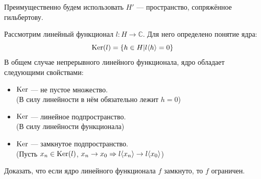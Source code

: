 \documentclass[12pt]{article}
\begin{document}
		Преимущественно будем использовать $H'$ --- пространство, сопряжённое гильбертову.
	
		Рассмотрим линейный функционал $l: H \rightarrow \mathbb{C}$. Для него определено понятие ядра:
		$$\text{Ker}(l) = \{ h \in H | l \langle h \rangle = 0\}$$
		В общем случае непрерывного линейного функционала, ядро обладает следующими свойствами:
		\begin{itemize}
			\item $\text{Ker}$ --- не пустое множество. \\
			(В силу линейности в нём обязательно лежит $h = 0$)
			\item $\text{Ker}$ --- линейное подпространство. \\
			(В силу линейности функционала)
			\item $\text{Ker}$ --- замкнутое подпространство. \\
			(Пусть $x_n \in \text{Ker}(l)$, $x_n \rightarrow x_0 \Rightarrow l\langle x_n \rangle \rightarrow l\langle x_0 \rangle$)
		\end{itemize}
	
		\exc Доказать, что если ядро линейного функционала $f$ замкнуто, то $f$ ограничен.
	
\end{document}
